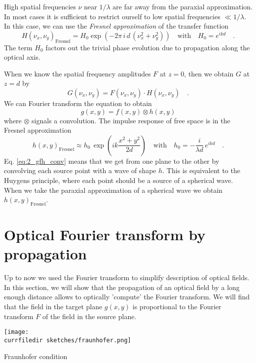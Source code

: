 High spatial frequencies $\nu$ near $1/\lambda$ are far away from the paraxial approximation. In most cases it is sufficient to restrict ourself to low spatial frequencies $ \ll 1/\lambda$. In this case, we can use the \emph{Fresnel approximation} of the transfer function
\begin{equation}
    H(\nu_x, \nu_y)_\text{Fresnel} = H_0 \exp \left(  
   - 2 \pi \, i  \, d \, (
 \nu_x^2 + \nu_y^2 )
    \right) \quad \text{with} \quad H_0 = e^{i k d} \quad .
\end{equation}
The term $H_0$ factors out the trivial phase evolution due to propagation along the optical axis.

When we know the spatial frequency amplitudes $F$ at $z=0$, then we obtain $G$ at $z=d$ by
\begin{equation}
    G(\nu_x, \nu_y) =  F(\nu_x, \nu_y) \cdot  H(\nu_x, \nu_y) \quad .
\end{equation}
We can Fourier transform the equation to obtain 
\begin{equation}
    g(x,y) = f(x,y) \otimes h(x,y) \label{eq:2_gfh_conv}
\end{equation}
where $\otimes$ signals a convolution. The impulse response of free space is in the Fresnel approximation
\begin{equation}
    h(x,y)_\text{Fresnel} \approx h_0 \, \exp \left(i k \frac{x^2 + y^2 }{2d} \right) \quad \text{with} \quad
    h_0 = -\frac{i}{\lambda d} \,  e^{i k d } \quad .
\end{equation}
Eq. \ref{eq:2_gfh_conv} means that we get from one plane to the other by convolving each source point with a wave of shape $h$. This is equivalent to the Huygens principle, where each point should be a source of a spherical wave. When we take the paraxial approximation of a spherical wave we obtain $ h(x,y)_\text{Fresnel}$.


\section{Optical Fourier transform by propagation}

Up to now we used the Fourier transform to simplify description of optical fields. In this section, we will show that the propagation of an optical field by a long enough distance allows to optically 'compute' the Fourier transform. We will find that the field in the target plane $g(x,y)$ is proportional to the Fourier transform $F$ of the field in the source plane.

\begin{marginfigure}
    \texttt{[image: \\currfiledir sketches/fraunhofer.png]}
    \caption{Fraunhofer condition}
\end{marginfigure}

